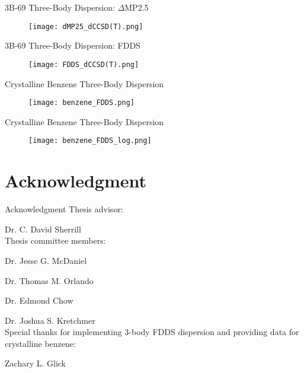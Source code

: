 \documentclass{beamer}
\begin{document}
        \begin{frame}{3B-69 Three-Body Dispersion: $\Delta$MP2.5}
            \begin{figure}
                \centering
                \texttt{[image: dMP25\_dCCSD(T).png]}
            \end{figure}
        \end{frame}

        \begin{frame}{3B-69 Three-Body Dispersion: FDDS}
            \begin{figure}
                \centering
                \texttt{[image: FDDS\_dCCSD(T).png]}
            \end{figure}
        \end{frame}

        \begin{frame}{Crystalline Benzene Three-Body Dispersion}
            \begin{figure}
                \centering
                \texttt{[image: benzene\_FDDS.png]}
            \end{figure}
        \end{frame}

        \begin{frame}{Crystalline Benzene Three-Body Dispersion}
            \begin{figure}
                \centering
                \texttt{[image: benzene\_FDDS\_log.png]}
            \end{figure}
        \end{frame}

\section{Acknowledgment}

        \begin{frame}{Acknowledgment}
            Thesis advisor:

            \hspace{36pt} Dr. C. David Sherrill \\

            Thesis committee members:

            \hspace{36pt} Dr. Jesse G. McDaniel

            \hspace{36pt} Dr. Thomas M. Orlando

            \hspace{36pt} Dr. Edmond Chow 

            \hspace{36pt} Dr. Joshua S. Kretchmer \\

            Special thanks for implementing 3-body FDDS dispersion and providing data for crystalline benzene:

            \hspace{36pt} Zachary L. Glick
        \end{frame}
\end{document}
